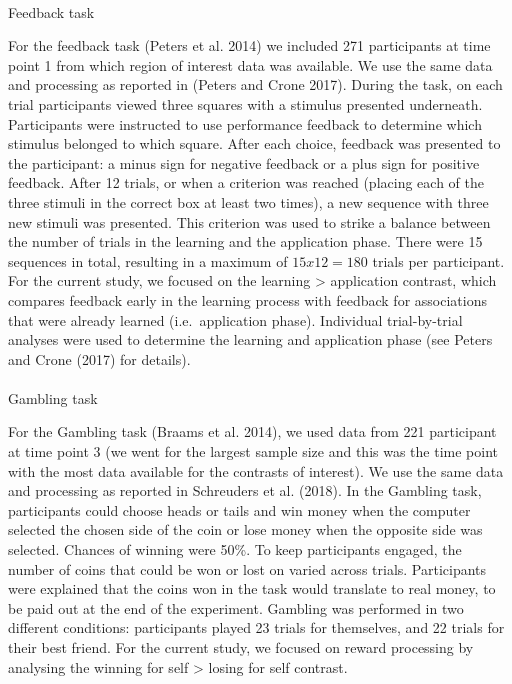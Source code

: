\documentclass[
  letterpaper,
  DIV=11,
  numbers=noendperiod]{scrartcl}
\makeatletter
\let\oldparagraph\paragraph
\renewcommand{\paragraph}{
    \@ifstar
      \xxxParagraphStar
      \xxxParagraphNoStar
  }
\newcommand{\xxxParagraphStar}[1]{\oldparagraph*{#1}\mbox{}}
\newcommand{\xxxParagraphNoStar}[1]{\oldparagraph{#1}\mbox{}}
\makeatother
\begin{document}
\paragraph{Feedback task}\label{feedback-task}

For the feedback task (Peters et al. 2014) we included 271 participants
at time point 1 from which region of interest data was available. We use
the same data and processing as reported in (Peters and Crone 2017).
During the task, on each trial participants viewed three squares with a
stimulus presented underneath. Participants were instructed to use
performance feedback to determine which stimulus belonged to which
square. After each choice, feedback was presented to the participant: a
minus sign for negative feedback or a plus sign for positive feedback.
After 12 trials, or when a criterion was reached (placing each of the
three stimuli in the correct box at least two times), a new sequence
with three new stimuli was presented. This criterion was used to strike
a balance between the number of trials in the learning and the
application phase. There were 15 sequences in total, resulting in a
maximum of \(15 x 12 = 180\) trials per participant. For the current
study, we focused on the learning \textgreater{} application contrast,
which compares feedback early in the learning process with feedback for
associations that were already learned (i.e.~application phase).
Individual trial-by-trial analyses were used to determine the learning
and application phase (see Peters and Crone (2017) for details).

\paragraph{Gambling task}\label{gambling-task}

For the Gambling task (Braams et al. 2014), we used data from 221
participant at time point 3 (we went for the largest sample size and
this was the time point with the most data available for the contrasts
of interest). We use the same data and processing as reported in
Schreuders et al. (2018). In the Gambling task, participants could
choose heads or tails and win money when the computer selected the
chosen side of the coin or lose money when the opposite side was
selected. Chances of winning were 50\%. To keep participants engaged,
the number of coins that could be won or lost on varied across trials.
Participants were explained that the coins won in the task would
translate to real money, to be paid out at the end of the experiment.
Gambling was performed in two different conditions: participants played
23 trials for themselves, and 22 trials for their best friend. For the
current study, we focused on reward processing by analysing the winning
for self \textgreater{} losing for self contrast.
\end{document}
